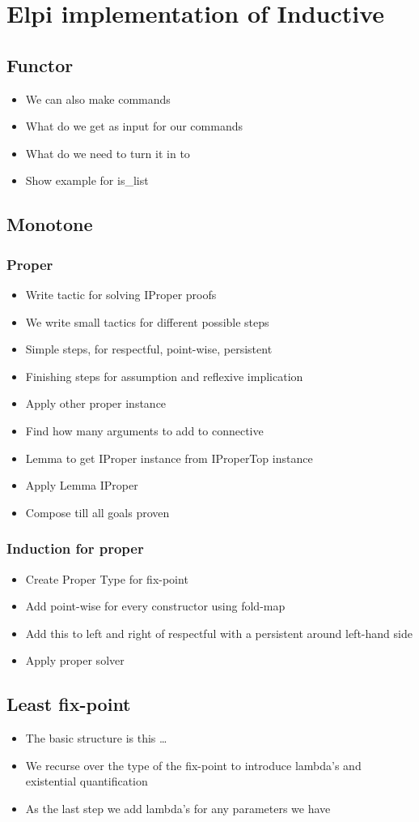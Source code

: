 \documentclass[thesis.tex]{subfiles}
\begin{document}
\chapter{Elpi implementation of Inductive}
\section{Functor}

\begin{itemize}
    \item We can also make commands
    \item What do we get as input for our commands
    \item What do we need to turn it in to
    \item Show example for is_list
\end{itemize}

\section{Monotone}
\subsection{Proper}
\begin{itemize}
    \item Write tactic for solving IProper proofs
    \item We write small tactics for different possible steps
    \item Simple steps, for respectful, point-wise, persistent
    \item Finishing steps for assumption and reflexive implication
    \item Apply other proper instance
    \item Find how many arguments to add to connective
    \item Lemma to get IProper instance from IProperTop instance
    \item Apply Lemma IProper
    \item Compose till all goals proven
\end{itemize}

\subsection{Induction for proper}
\begin{itemize}
    \item Create Proper Type for fix-point
    \item Add point-wise for every constructor using fold-map
    \item Add this to left and right of respectful with a persistent around left-hand side
    \item Apply proper solver
\end{itemize}

\section{Least fix-point}
\begin{itemize}
    \item The basic structure is this \dots
    \item We recurse over the type of the fix-point to introduce lambda's and existential quantification
    \item As the last step we add lambda's for any parameters we have
\end{itemize}
\end{document}
